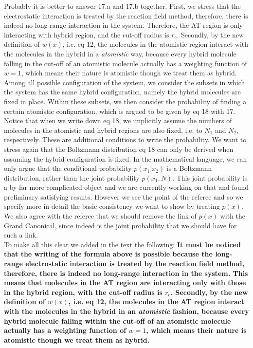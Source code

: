 \documentclass[a4paper]{article}
\begin{document}
Probably it is better to answer 17.a and 17.b together.  First, we
stress that the electrostatic interaction is treated by the reaction
field method, therefore, there is indeed no long-range interaction in
the system. Therefore, the AT region is only interacting with hybrid
region, and the cut-off radius is $r_c$. Secondly, by the new
definition of $w(x)$, i.e. eq 12, the molecules in the atomistic
region interact with the molecules in the hybrid in a 
\emph{atomistic} way, because every hybrid molecule falling in the cut-off of
an atomistic molecule actually has a weighting function of $w=1$,
which means their nature is atomistic though we treat them as hybrid.
Among all possible configuration of the system, we consider
the subsets in which the system has the same hybrid configuration,
namely the hybrid molecules are fixed in place. Within
these subsets, we then
consider the probability of finding a certain atomistic configuration,
which
is argued to be given by eq 18 with 17.
Notice that when we write down eq 18, we implicitly assume
the numbers of molecules in the atomistic and hybrid regions
are also fixed, i.e. to $N_1$ and $N_2$, respectively.
These are additional conditions to write the probability.
We want to stress again that the Boltzmann distribution eq 18
can only be derived when assuming the hybrid configuration
is fixed. In the mathematical language, we can only argue
that the conditional probability $p(x_1|x_2)$ is a Boltzmann distribution,
rather than the joint probability $p(x_1, N)$. This joint probability is a by far more complicated object and we are currently working on that and found preliminary satisfying results. 
However we see the point of the referee and so we specify more in detail the basic consistency we want to show by treating $p(x)$. We also agree with the referee that we should remove the link of $p(x)$ with the Grand Canonical, since indeed is the joint probability that we should have for such a link.\\
To make all this clear we added in the text the following: {\bf It must be noticed that the writing of the formula above is possible because the long-range electrostatic interaction is treated by the reaction
field method, therefore, there is indeed no long-range interaction in
the system. This means that molecules in the AT region are interacting only with those in the hybrid
region, with the cut-off radius is $r_c$. Secondly, by the new
definition of $w(x)$, i.e. eq 12, the molecules in the AT
region interact with the molecules in the hybrid in an 
\emph{atomistic} fashion, because every hybrid molecule falling within the cut-off of
an atomistic molecule actually has a weighting function of $w=1$,
which means their nature is atomistic though we treat them as hybrid.}\\
\end{document}
